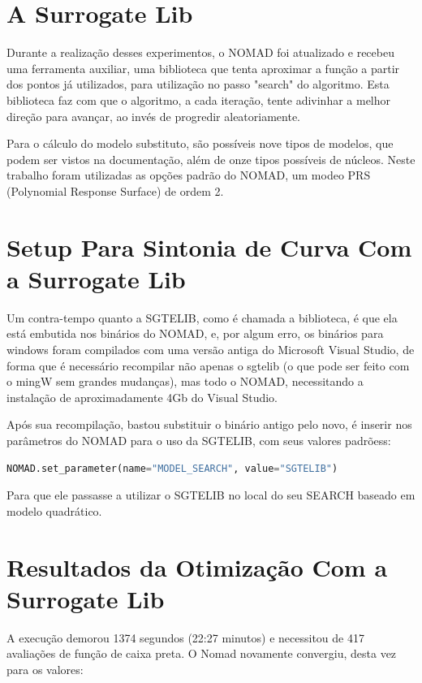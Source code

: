\section{A Surrogate Lib}

Durante a realização desses experimentos, o NOMAD foi atualizado e recebeu uma ferramenta auxiliar, uma biblioteca que tenta aproximar a função a partir dos pontos já utilizados, para utilização no passo "search" do algoritmo. Esta biblioteca faz com que o algoritmo, a cada iteração, tente adivinhar a melhor direção para avançar, ao invés de progredir aleatoriamente.

Para o cálculo do modelo substituto, são possíveis nove tipos de modelos, que podem ser vistos na documentação, além de onze tipos possíveis de núcleos. Neste trabalho foram utilizadas as opções padrão do NOMAD, um modeo PRS (Polynomial Response Surface) de ordem 2.


\section{Setup Para Sintonia de Curva Com a Surrogate Lib}

Um contra-tempo quanto a SGTELIB, como é chamada a biblioteca, é que ela está embutida nos binários do NOMAD, e, por algum erro, os binários para windows foram compilados com uma versão antiga do Microsoft Visual Studio, de forma que é necessário recompilar não apenas o sgtelib (o que pode ser feito com o mingW sem grandes mudanças), mas todo o NOMAD, necessitando a instalação de aproximadamente 4Gb do Visual Studio.

Após sua recompilação, bastou substituir o binário antigo pelo novo, é inserir nos parâmetros do NOMAD para o uso da SGTELIB, com seus valores padrõess:
\begin{lstlisting}[language=Python]
NOMAD.set_parameter(name="MODEL_SEARCH", value="SGTELIB")
\end{lstlisting}
Para que ele passasse a utilizar o SGTELIB no local do seu SEARCH baseado em modelo quadrático.


\section{Resultados da Otimização Com a Surrogate Lib}

A execução demorou 1374 segundos (22:27 minutos) e necessitou de 417 avaliações de função de caixa preta. O Nomad novamente convergiu, desta vez para os 	valores:

